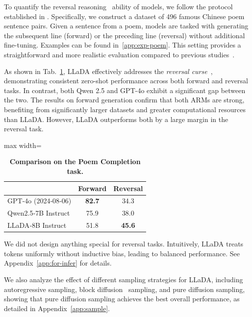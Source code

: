 \documentclass{article}
\begin{document}
To quantify the reversal reasoning~\citep{berglund2023reversal} ability of models, we follow the protocol established in \citet{AL2023-knowledge2}. Specifically, we construct a dataset of 496 famous Chinese poem sentence pairs. Given a sentence from a poem, models are tasked with generating the subsequent line (forward) or the preceding line (reversal) without additional fine-tuning. Examples can be found in~\cref{app:exp-poem}. This setting provides a straightforward and more realistic evaluation compared to previous studies~\citep{nie2024scaling,kitouni2024factorization}.

As shown in Tab.~\ref{tbl:poems_completion}, LLaDA effectively addresses the \emph{reversal curse}~\citep{berglund2023reversal}, demonstrating consistent zero-shot performance across both forward and reversal tasks. In contrast, both Qwen 2.5 and GPT-4o exhibit a significant gap between the two. The results on forward generation confirm that both ARMs are strong, benefiting from significantly larger datasets and greater computational resources than LLaDA. However, LLaDA outperforms both by a large margin in the reversal task.

\begin{table}  %
  \centering
  \caption{\textbf{Comparison on the Poem Completion task.} }
  \label{tbl:poems_completion}
  \begin{adjustbox}{max width=\linewidth}
  \begin{tabular}{lcc}
    \toprule
    & Forward & Reversal \\ 
    \midrule
    GPT-4o (2024‑08‑06)  & \textbf{82.7} & 34.3 \\
    Qwen2.5‑7B Instruct & 75.9          & 38.0 \\
    LLaDA‑8B Instruct   & 51.8          & \textbf{45.6} \\
    \bottomrule
  \end{tabular}
  \end{adjustbox}
\end{table}



We did not design anything special for reversal tasks. Intuitively, LLaDA treats tokens uniformly without inductive bias, leading to balanced performance. See Appendix~\ref{app:for-infer} for details.



We also analyze the effect of different sampling strategies for LLaDA, including autoregressive sampling, block diffusion~\citep{arriola2025block} sampling, and pure diffusion sampling, showing that pure diffusion sampling achieves the best overall performance, as detailed in Appendix~\ref{app:sample}. 
\end{document}
